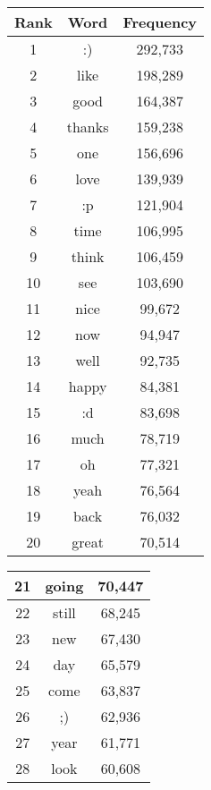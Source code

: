 \begin{table}[!htbp]
\begin{minipage}[b]{.5\textwidth}
	\centering
	\begin{tabular}{|c|c|c|} %
		\hline
		\textbf{Rank} & \textbf{Word} & \textbf{Frequency}  \\ \hline
		1 & :) & 292,733 \\ \hline
		2 & like & 198,289 \\ \hline
		3 & good & 164,387 \\ \hline
		4 & thanks & 159,238 \\ \hline
		5 & one & 156,696 \\ \hline
		6 & love & 139,939 \\ \hline
		7 & :p & 121,904 \\ \hline
		8 & time & 106,995 \\ \hline
		9 & think & 106,459 \\ \hline
		10 & see & 103,690 \\ \hline
		11 & nice & 99,672 \\ \hline
		12 & now & 94,947 \\ \hline
		13 & well & 92,735 \\ \hline
		14 & happy & 84,381 \\ \hline
		15 & :d & 83,698 \\ \hline
		16 & much & 78,719 \\ \hline
		17 & oh & 77,321 \\ \hline
		18 & yeah & 76,564 \\ \hline
		19 & back & 76,032 \\ \hline
		20 & great & 70,514 \\ \hline
		\end{tabular}
\end{minipage}
\begin{minipage}[b]{.5\textwidth}
\centering
\begin{tabular}{|c|c|c|} %
		\hline
		21 & going & 70,447 \\ \hline
		22 & still & 68,245 \\ \hline
		23 & new & 67,430 \\ \hline
		24 & day & 65,579 \\ \hline
		25 & come & 63,837 \\ \hline
		26 & ;) & 62,936 \\ \hline
		27 & year & 61,771 \\ \hline
		28 & look & 60,608 \\ \hline

\end{tabular}
\end{minipage}
\end{table}
